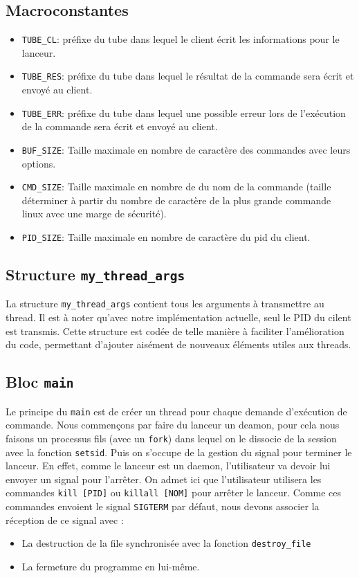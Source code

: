 \documentclass[12pt]{article}
\begin{document}
    \subsection{Macroconstantes}
    \begin{itemize}
        \item \texttt{TUBE\_CL}: préfixe du tube dans lequel le client écrit les
        informations pour le lanceur.
        \item \texttt{TUBE\_RES}: préfixe du tube dans lequel le résultat de la
        commande sera écrit et envoyé au client.
        \item \texttt{TUBE\_ERR}: préfixe du tube dans lequel une possible erreur
        lors de l'exécution de la commande sera écrit et envoyé au client.
        \item \texttt{BUF\_SIZE}: Taille maximale en nombre de caractère des commandes
        avec leurs options.
        \item \texttt{CMD\_SIZE}: Taille maximale en nombre de du nom de la commande
        (taille déterminer à partir du nombre de caractère de la plus
        grande commande linux avec une marge de sécurité).
        \item \texttt{PID\_SIZE}: Taille maximale en nombre de caractère du pid du client.
    \end{itemize}

    \subsection{Structure \texttt{my\_thread\_args}}
    La structure \texttt{my\_thread\_args} contient tous les arguments à
    transmettre au thread.
    Il est à noter qu'avec notre implémentation actuelle, seul le PID du cilent est transmis. Cette structure est codée de telle manière à faciliter l'amélioration du code, permettant d'ajouter aisément de nouveaux éléments utiles aux threads.

    \subsection{Bloc \texttt{main}}
    Le principe du \texttt{main} est de créer un thread pour chaque demande d'exécution de
    commande.
    Nous commençons par faire du lanceur un deamon, pour cela nous faisons un processus fils (avec un \texttt{fork}) dans lequel on le dissocie de la session avec la fonction \texttt{setsid}.
    Puis on s'occupe de la gestion du signal pour terminer le lanceur. En effet, comme le lanceur est un daemon, l'utilisateur va devoir lui envoyer un signal pour l'arrêter. On admet ici que l'utilisateur utilisera les commandes \texttt{kill  [PID]} ou \texttt{killall [NOM]} pour arrêter le lanceur. Comme ces commandes envoient le signal \texttt{SIGTERM} par défaut, nous devons associer la réception de ce signal avec :
    \begin{itemize}
        \item La destruction de la file synchronisée avec la fonction \texttt{destroy\_file}
        \item La fermeture du programme en lui-même.
    \end{itemize}
\end{document}
